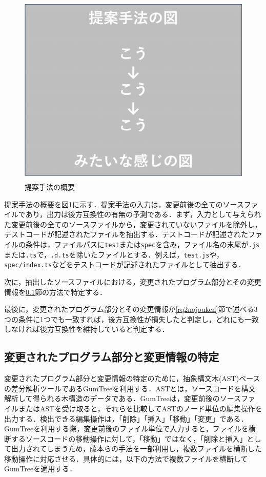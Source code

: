 \documentclass[11pt,dvipdfmx]{jreport}
\begin{document}
\begin{figure}[t]
  \label{fig:rq2.syuhou}
  \centering
  \includegraphics[width=1.0\linewidth]{fig/teiannshuhou.pdf}
  \caption{提案手法の概要}
\end{figure}

提案手法の概要を図\ref{fig:rq2.syuhou}に示す．提案手法の入力は，変更前後の全てのソースファイルであり，出力は後方互換性の有無の予測である．まず，入力として与えられた変更前後の全てのソースファイルから，変更されていないファイルを除外し，テストコードが記述されたファイルを抽出する．テストコードが記述されたファイルの条件は，ファイルパスに{\verb|test|}または{\verb|spec|}を含み，ファイル名の末尾が{\verb|.js|}または{\verb|.ts|}で，{\verb|.d.ts|}を除いたファイルとする．例えば，{\verb|test.js|}や，{\verb|spec/index.ts|}などをテストコードが記述されたファイルとして抽出する．

次に，抽出したソースファイルにおける，変更されたプログラム部分とその変更情報を\ref{astseisei}節の方法で特定する．

最後に，変更されたプログラム部分とその変更情報が\ref{rq2nojouken}節で述べる3つの条件に1つでも一致すれば，後方互換性が損失したと判定し，どれにも一致しなければ後方互換性を維持していると判定する．

\subsection{変更されたプログラム部分と変更情報の特定}\label{astseisei}
変更されたプログラム部分と変更情報の特定のために，抽象構文木(AST)ベースの差分解析ツールであるGumTree\cite{gumtree}を利用する．ASTとは，ソースコードを構文解析して得られる木構造のデータである．GumTreeは，変更前後のソースファイルまたはASTを受け取ると，それらを比較してASTのノード単位の編集操作を出力する．検出できる編集操作は，「削除」「挿入」「移動」「変更」である．GumTreeを利用する際，変更前後のファイル単位で入力すると，ファイルを横断するソースコードの移動操作に対して，「移動」ではなく，「削除と挿入」として出力されてしまうため，藤本らの手法\cite{gumtreenoyatu}を一部利用し，複数ファイルを横断した移動操作に対応させる．具体的には，以下の方法で複数ファイルを横断してGumTreeを適用する．
\end{document}
